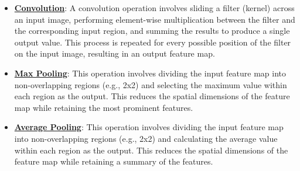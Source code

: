 \documentclass{article}%
\begin{document}
\begin{itemize}[leftmargin=*]
\item \href{https://purdue.brightspace.com/d2l/common/assets/pdfjs-d2l-dist/1.0.14-legacy/web/viewer.html?file=\%2Fcontent\%2Fenforced\%2F1095467-wl.202510.CS.24300.001\%2F09L1-cnn.pdf\%3Fou\%3D1095467\&lang=en-us\&container=d2l-fileviewer-rendered-pdf\&fullscreen=d2l-fileviewer-rendered-pdf-dialog\&height=667#page=6}{\textbf{Convolution}}: A convolution operation involves sliding a filter (kernel) across an input image, performing element-wise multiplication between the filter and the corresponding input region, and summing the results to produce a single output value. This process is repeated for every possible position of the filter on the input image, resulting in an output feature map.%
\item \href{https://purdue.brightspace.com/d2l/common/assets/pdfjs-d2l-dist/1.0.14-legacy/web/viewer.html?file=\%2Fcontent\%2Fenforced\%2F1095467-wl.202510.CS.24300.001\%2F09L1-cnn.pdf\%3Fou\%3D1095467\&lang=en-us\&container=d2l-fileviewer-rendered-pdf\&fullscreen=d2l-fileviewer-rendered-pdf-dialog\&height=667#page=14}{\textbf{Max Pooling}}: This operation involves dividing the input feature map into non-overlapping regions (e.g., 2x2) and selecting the maximum value within each region as the output. This reduces the spatial dimensions of the feature map while retaining the most prominent features.%
\item \href{https://purdue.brightspace.com/d2l/common/assets/pdfjs-d2l-dist/1.0.14-legacy/web/viewer.html?file=\%2Fcontent\%2Fenforced\%2F1095467-wl.202510.CS.24300.001\%2F09L1-cnn.pdf\%3Fou\%3D1095467\&lang=en-us\&container=d2l-fileviewer-rendered-pdf\&fullscreen=d2l-fileviewer-rendered-pdf-dialog\&height=667#page=15}{\textbf{Average Pooling}}: This operation involves dividing the input feature map into non-overlapping regions (e.g., 2x2) and calculating the average value within each region as the output. This reduces the spatial dimensions of the feature map while retaining a summary of the features.%
\end{itemize}

%
\end{document}
